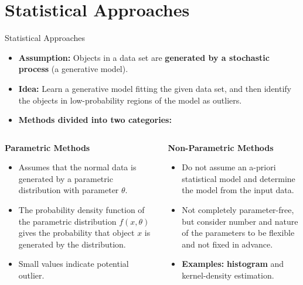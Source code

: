 \section{Statistical Approaches}


\begin{frame}{Statistical Approaches}
	\begin{itemize}
		\item \textbf{Assumption:} Objects in a data set are \textbf{\color{airforceblue}generated by a stochastic process} (a generative model).
		\item \textbf{Idea:} Learn a generative model fitting the given data set, and then identify the objects in low-probability regions of the model as outliers.
		\item \textbf{Methods divided into two categories:}
	\end{itemize}
	\vspace*{-2em}
	\begin{columns}
		\begin{column}{0.5\textwidth}
			\begin{center}
				\textbf{Parametric Methods}
			\end{center}
			\vspace*{-1.2em}
			\begin{itemize}
				\item Assumes that the normal data is generated by a parametric distribution with parameter $\theta$.
				\item The probability density function of the parametric distribution $f(x, \theta)$ gives the probability that object $x$ is generated by the distribution.
				\item Small values indicate potential outlier.
			\end{itemize}
		\end{column}
		\begin{column}{0.5\textwidth}
			\pause
			\begin{center}
				\textbf{Non-Parametric Methods}
			\end{center}
			\vspace*{-1.2em}
			\begin{itemize}
				\item Do not assume an a-priori statistical model and determine the model from the input data.
				\item Not completely parameter-free, but consider number and nature of the parameters to be flexible and not fixed in advance.
				\item \textbf{Examples:} \textbf{\color{airforceblue}histogram} and kernel-density estimation.
			\end{itemize}
		\end{column}
	\end{columns}
\end{frame}


